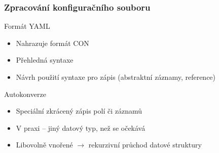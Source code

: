 \begin{frame}[fragile]
	\frametitle{Zpracování konfiguračního souboru}
	\begin{minipage}[t]{0.45\textwidth}
	\begin{block}{Formát YAML}
	\begin{itemize}
		\item<3-> Nahrazuje formát CON
		\item<4-> Přehledná syntaxe
		\item<5-> Návrh použití syntaxe pro zápis (abstraktní záznamy, reference)
	\end{itemize}
	\end{block}
	\end{minipage}
	\hspace{5pt}
	\begin{minipage}[t]{0.45\textwidth}
	\begin{block}{Autokonverze}
	\begin{itemize}
		\item<7-> Speciální zkrácený zápis polí či záznamů
		\item<8-> V praxi -- jiný datový typ, než se očekává
		\item<9-> Libovolně vnořené $\rightarrow$ rekurzivní průchod datové struktury
	\end{itemize}
	\end{block}
	\end{minipage}
\end{frame}


